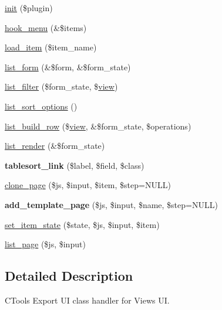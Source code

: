 \begin{DoxyCompactItemize}
\item 
\hyperlink{classviews__ui_aaa0602d4d7f77dc16eb57cc910aa87ac}{init} (\$plugin)
\item 
\hyperlink{classviews__ui_a2a5885b9b860fd53a304e1ac38237a56}{hook\_\-menu} (\&\$items)
\item 
\hyperlink{classviews__ui_a214105ecb1527a6ccf712fd6ec3f4c0c}{load\_\-item} (\$item\_\-name)
\item 
\hyperlink{classviews__ui_a9f2606bd8902df2f4b1fe3a9a55c9906}{list\_\-form} (\&\$form, \&\$form\_\-state)
\item 
\hyperlink{classviews__ui_a1b35936c70aff9359beb8d515af9e8ec}{list\_\-filter} (\$form\_\-state, \$\hyperlink{classview}{view})
\item 
\hyperlink{classviews__ui_a5f6a2333d7d780bf6760ce94bfe5d943}{list\_\-sort\_\-options} ()
\item 
\hyperlink{classviews__ui_a195a6a1e5b21641032447fb474291e68}{list\_\-build\_\-row} (\$\hyperlink{classview}{view}, \&\$form\_\-state, \$operations)
\item 
\hyperlink{classviews__ui_a51cb7760695677e83c5f9635a76c3211}{list\_\-render} (\&\$form\_\-state)
\item 
\hypertarget{classviews__ui_a93e865cb8d1aa8d3a3b547c2c754b0fe}{
{\bfseries tablesort\_\-link} (\$label, \$field, \$class)}
\label{classviews__ui_a93e865cb8d1aa8d3a3b547c2c754b0fe}

\item 
\hyperlink{classviews__ui_a5c8914e69b780b3257c15e635f39699c}{clone\_\-page} (\$js, \$input, \$item, \$step=NULL)
\item 
\hypertarget{classviews__ui_acf97d71494dc3b7fa7e25e218f8a6d09}{
{\bfseries add\_\-template\_\-page} (\$js, \$input, \$name, \$step=NULL)}
\label{classviews__ui_acf97d71494dc3b7fa7e25e218f8a6d09}

\item 
\hyperlink{classviews__ui_afd2f31ed4d97d797f8cb6d11e658545e}{set\_\-item\_\-state} (\$state, \$js, \$input, \$item)
\item 
\hyperlink{classviews__ui_a4f606da1d97a8f4cfa6c42bdad0ccaa1}{list\_\-page} (\$js, \$input)
\end{DoxyCompactItemize}


\subsection{Detailed Description}
CTools Export UI class handler for Views UI. 

